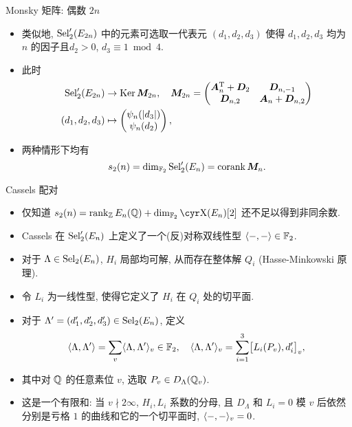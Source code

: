 \documentclass[handout,aspectratio=169]{ctexbeamer}
\begin{document}
\begin{frame}{Monsky 矩阵: 偶数 $2n$}
	\begin{itemize}
		\item 类似地, ${\mathrm{Sel}}_2'(E_{2n})$ 中的元素可选取一代表元 $(d_1,d_2,d_3)$ 使得 $d_1,d_2, d_3$ 均为 $n$ 的因子且$d_2>0$, $d_3\equiv1\bmod4$.
		\item 此时
		\[
			\begin{aligned}
				{\mathrm{Sel}}_2'(E_{2n})&\rightarrow\operatorname{Ker}{\boldsymbol{M}}_{2n},\quad {\boldsymbol{M}}_{2n}=\begin{pmatrix}
					{\boldsymbol{A}}_n^{\mathrm{T}}+{\boldsymbol{D}}_2&{\boldsymbol{D}}_{n,-1}\\
					{\boldsymbol{D}}_{n,2}&{\boldsymbol{A}}_n+{\boldsymbol{D}}_{n,2}
				\end{pmatrix}\\
				(d_1,d_2,d_3)&\mapsto\begin{pmatrix}
					\psi_n(|d_3|)\\ \psi_n(d_2)
				\end{pmatrix},
			\end{aligned}
		\]
		\item 两种情形下均有
		\[
			s_2(n)=\dim_{{\mathbb{F}}_2}{\mathrm{Sel}}_2'(E_n)=\operatorname{corank} {\boldsymbol{M}}_n.
		\]
	\end{itemize}
\end{frame}


\begin{frame}{Cassels 配对}
	\begin{itemize}
		\item 仅知道 $s_2(n)=\rank_\BZ E_n(\BQ)+\dim_{\BF_2}\Sha(E_n)[2]$ 还不足以得到非同余数.
		\item Cassels 在 ${\mathrm{Sel}}_2'(E_n)$ 上定义了一个(反)对称双线性型 $\langle{-,-}\rangle\in{\mathbb{F}}_2$.
		\item 对于 $\Lambda\in{\mathrm{Sel}}_2(E_n)$, $H_i$ 局部均可解, 从而存在整体解 $Q_i$ (Hasse-Minkowski 原理).
		\item 令 $L_i$ 为一线性型, 使得它定义了 $H_i$ 在 $Q_i$ 处的切平面.
		\item 对于 $\Lambda'=(d'_1,d'_2,d'_3)\in{\mathrm{Sel}}_2(E_n)$, 定义
		\[
			\langle{\Lambda,\Lambda'}\rangle=\sum_v\langle{\Lambda,\Lambda'}\rangle_v\in{\mathbb{F}}_2,
			\quad
			\langle{\Lambda,\Lambda'}\rangle_v
			=\sum_{i=1}^3 \bigl[L_i(P_v),d_i'\bigr]_v,
		\]
		\item 其中对 ${\mathbb{Q}}$ 的任意素位 $v$, 选取 $P_v\in D_\Lambda({\mathbb{Q}}_v)$.
		\item 这是一个有限和: 当 $v\nmid 2\infty$, $H_i,L_i$ 系数的分母, 且 $D_\Lambda$ 和 $L_i=0$ 模 $v$ 后依然分别是亏格 $1$ 的曲线和它的一个切平面时, $\langle{-,-}\rangle_v=0$.
	\end{itemize}
\end{frame}
\end{document}
